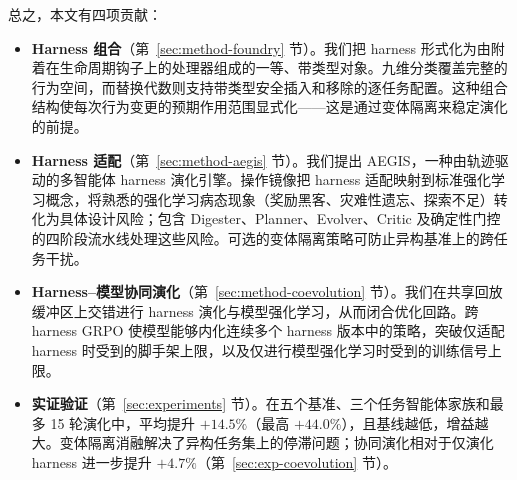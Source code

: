 总之，本文有四项贡献：
\begin{itemize}
  \item \textbf{Harness 组合}（第~\ref{sec:method-foundry} 节）。我们把 harness 形式化为由附着在生命周期钩子上的处理器组成的一等、带类型对象。九维分类覆盖完整的行为空间，而替换代数则支持带类型安全插入和移除的逐任务配置。这种组合结构使每次行为变更的预期作用范围显式化——这是通过变体隔离来稳定演化的前提。
  \item \textbf{Harness 适配}（第~\ref{sec:method-aegis} 节）。我们提出 AEGIS，一种由轨迹驱动的多智能体 harness 演化引擎。操作镜像把 harness 适配映射到标准强化学习概念，将熟悉的强化学习病态现象（奖励黑客、灾难性遗忘、探索不足）转化为具体设计风险；包含 Digester、Planner、Evolver、Critic 及确定性门控的四阶段流水线处理这些风险。可选的变体隔离策略可防止异构基准上的跨任务干扰。
  \item \textbf{Harness--模型协同演化}（第~\ref{sec:method-coevolution} 节）。我们在共享回放缓冲区上交错进行 harness 演化与模型强化学习，从而闭合优化回路。跨 harness GRPO 使模型能够内化连续多个 harness 版本中的策略，突破仅适配 harness 时受到的脚手架上限，以及仅进行模型强化学习时受到的训练信号上限。
  \item \textbf{实证验证}（第~\ref{sec:experiments} 节）。在五个基准、三个任务智能体家族和最多 15 轮演化中，\ProjectName 平均提升 $+14.5\%$（最高 $+44.0\%$），且基线越低，增益越大。变体隔离消融解决了异构任务集上的停滞问题；协同演化相对于仅演化 harness 进一步提升 $+4.7\%$（第~\ref{sec:exp-coevolution} 节）。
\end{itemize}
